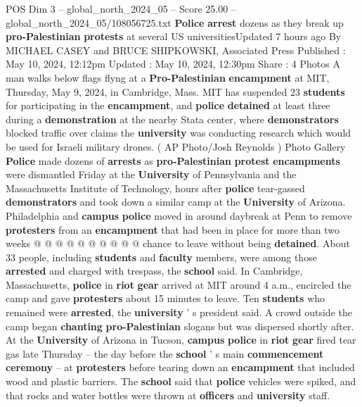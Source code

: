 \begin{textsample}{POS Dim 3 – global\_north\_2024\_05 – Score 25.00 – global\_north\_2024\_05/108056725.txt}  \label{ex:f3_pos_018}
\textbf{Police} \textbf{arrest} dozens as they break up \textbf{pro-Palestinian} \textbf{protests} at several US universitiesUpdated 7 hours ago By MICHAEL CASEY and BRUCE SHIPKOWSKI, Associated Press Published : May 10, 2024, 12:12pm Updated : May 10, 2024, 12:30pm Share : 4 Photos A man walks below flags flyng at a \textbf{Pro-Palestinian} \textbf{encampment} at MIT, Thursday, May 9, 2024, in Cambridge, Mass.
MIT has suspended 23 \textbf{students} for participating in the \textbf{encampment}, and \textbf{police} \textbf{detained} at least three during a \textbf{demonstration} at the nearby Stata center, where \textbf{demonstrators} blocked traffic over claims the \textbf{university} was conducting research which would be used for Israeli military drones. ( AP Photo/Josh Reynolds ) Photo Gallery \textbf{Police} made dozens of \textbf{arrests} as \textbf{pro-Palestinian} \textbf{protest} \textbf{encampments} were dismantled Friday at the \textbf{University} of Pennsylvania and the Massachusetts Institute of Technology, hours after \textbf{police} tear-gassed \textbf{demonstrators} and took down a similar camp at the \textbf{University} of Arizona.
Philadelphia and \textbf{campus} \textbf{police} moved in around daybreak at Penn to remove \textbf{protesters} from an \textbf{encampment} that had been in place for more than two weeks @ @ @ @ @ @ @ @ @ @ chance to leave without being \textbf{detained}.
About 33 people, including \textbf{students} and \textbf{faculty} members, were among those \textbf{arrested} and charged with trespass, the \textbf{school} said.
In Cambridge, Massachusetts, \textbf{police} in \textbf{riot} \textbf{gear} arrived at MIT around 4 a.m., encircled the camp and gave \textbf{protesters} about 15 minutes to leave.
Ten \textbf{students} who remained were \textbf{arrested}, the \textbf{university} ' s president said.
A crowd outside the camp began \textbf{chanting} \textbf{pro-Palestinian} slogans but was dispersed shortly after.
At the \textbf{University} of Arizona in Tucson, \textbf{campus} \textbf{police} in \textbf{riot} \textbf{gear} fired tear gas late Thursday -- the day before the \textbf{school} ' s main \textbf{commencement} \textbf{ceremony} -- at \textbf{protesters} before tearing down an \textbf{encampment} that included wood and plastic barriers.
The \textbf{school} said that \textbf{police} vehicles were spiked, and that rocks and water bottles were thrown at \textbf{officers} and \textbf{university} staff.

\end{textsample}
